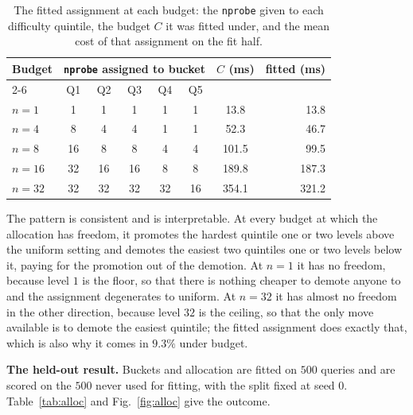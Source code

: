 \documentclass[journal]{IEEEtran}
\newcommand{\nprobe}{\texttt{nprobe}}
\begin{document}
\begin{table}[!t]
\caption{The fitted assignment at each budget: the \nprobe{} given to each
difficulty quintile, the budget $C$ it was fitted under, and the mean cost
of that assignment on the fit half.}
\label{tab:assignments}
\centering
\begin{tabular}{lccccccr}
\toprule
\multirow{2}{*}{Budget} & \multicolumn{5}{c}{\nprobe{} assigned to bucket} & \multirow{2}{*}{$C$ (ms)} & \multirow{2}{*}{fitted (ms)} \\
\cmidrule(lr){2-6}
 & Q1 & Q2 & Q3 & Q4 & Q5 & & \\
\midrule
$n{=}1$  & 1  & 1  & 1  & 1  & 1  & 13.8  & 13.8 \\
$n{=}4$  & 8  & 4  & 4  & 1  & 1  & 52.3  & 46.7 \\
$n{=}8$  & 16 & 8  & 8  & 4  & 4  & 101.5 & 99.5 \\
$n{=}16$ & 32 & 16 & 16 & 8  & 8  & 189.8 & 187.3 \\
$n{=}32$ & 32 & 32 & 32 & 32 & 16 & 354.1 & 321.2 \\
\bottomrule
\end{tabular}
\end{table}

The pattern is consistent and is interpretable. At every budget at which
the allocation has freedom, it promotes the hardest quintile one or two
levels above the uniform setting and demotes the easiest two quintiles one
or two levels below it, paying for the promotion out of the demotion. At
$n{=}1$ it has no freedom, because level $1$ is the floor, so that there is
nothing cheaper to demote anyone to and the assignment degenerates to
uniform. At $n{=}32$ it has almost no freedom in the other direction,
because level $32$ is the ceiling, so that the only move available is to
demote the easiest quintile; the fitted assignment does exactly that, which
is also why it comes in $9.3\%$ under budget.

\textbf{The held-out result.} Buckets and allocation are fitted on $500$
queries and are scored on the $500$ never used for fitting, with the split
fixed at seed $0$. Table~\ref{tab:alloc} and Fig.~\ref{fig:alloc} give the
outcome.
\end{document}
